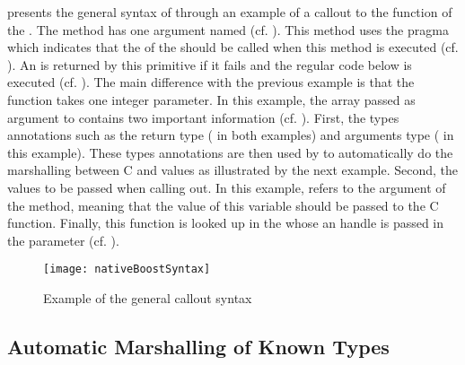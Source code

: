  presents the general syntax of \NBFFI through an example of a callout to the  function of the .
The  method has one argument named  (cf. ).
This method uses the pragma  which indicates that the  of the  should be called when this method is executed (cf. ).
An  is returned by this primitive if it fails and the regular \ST code below is executed (cf. ).
The main difference with the previous example is that the  function takes one integer parameter.
In this example, the array  passed as argument to  contains two important information (cf. ).
First, the types annotations such as the return type ( in both examples) and arguments type ( in this example).
These types annotations are then used by \NBFFI to automatically do the marshalling between C and \PH values as illustrated by the next example.
Second, the values to be passed when calling out.
In this example,  refers to the argument of the  method, meaning that the value of this variable should be passed to the  C function.
Finally, this  function is looked up in the  whose an handle is passed in the  parameter (cf. ).
%
%
\begin{figure}[H]
	\centering
	\texttt{[image: nativeBoostSyntax]}
	\caption[\NB Basic Method]{Example of the general \NBFFI callout syntax}
\end{figure}

\subsection{Automatic Marshalling of Known Types}

